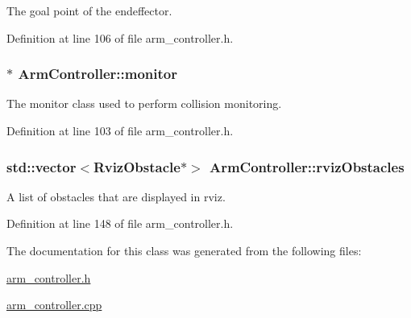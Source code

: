 The goal point of the endeffector. 



Definition at line 106 of file arm\+\_\+controller.\+h.

\subsubsection[{\texorpdfstring{monitor}{monitor}}]{$\ast$ Arm\+Controller\+::monitor}\hypertarget{class_arm_controller_a939747279bba6db315f80092a74c2629}{}\label{class_arm_controller_a939747279bba6db315f80092a74c2629}


The monitor class used to perform collision monitoring. 



Definition at line 103 of file arm\+\_\+controller.\+h.

\subsubsection[{\texorpdfstring{rviz\+Obstacles}{rvizObstacles}}]{\setlength{\rightskip}{0pt plus 5cm}std\+::vector$<${\bf Rviz\+Obstacle}$\ast$$>$ Arm\+Controller\+::rviz\+Obstacles}\hypertarget{class_arm_controller_ab94a1abce40096f6476404d49d00860f}{}\label{class_arm_controller_ab94a1abce40096f6476404d49d00860f}


A list of obstacles that are displayed in rviz. 



Definition at line 148 of file arm\+\_\+controller.\+h.



The documentation for this class was generated from the following files\+:\begin{DoxyCompactItemize}
\item 
\hyperlink{arm__controller_8h}{arm\+\_\+controller.\+h}\item 
\hyperlink{arm__controller_8cpp}{arm\+\_\+controller.\+cpp}\end{DoxyCompactItemize}
